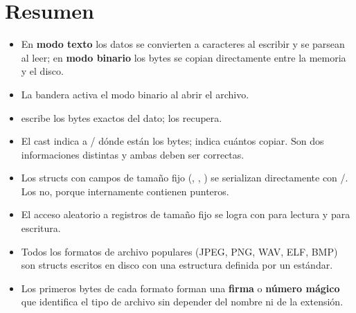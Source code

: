 \documentclass[12pt, oneside]{article}
\begin{document}
\section*{Resumen}

\begin{itemize}
  \item En \textbf{modo texto} los datos se convierten a caracteres al
        escribir y se parsean al leer; en \textbf{modo binario} los bytes
        se copian directamente entre la memoria y el disco.
  \item La bandera  activa el modo binario al abrir
        el archivo.
  \item {} escribe los bytes exactos
        del dato;  los recupera.
  \item El cast  indica a / dónde
        están los bytes;  indica cuántos copiar.  Son dos
        informaciones distintas y ambas deben ser correctas.
  \item Los structs con campos de tamaño fijo (, ,
        ) se serializan directamente con /.
        Los  no, porque internamente contienen punteros.
  \item El acceso aleatorio a registros de tamaño fijo se logra con
         para lectura y
         para escritura.
  \item Todos los formatos de archivo populares (JPEG, PNG, WAV, ELF, BMP)
        son structs escritos en disco con una estructura definida por un
        estándar.
  \item Los primeros bytes de cada formato forman una \textbf{firma} o
        \textbf{número mágico} que identifica el tipo de archivo sin
        depender del nombre ni de la extensión.
\end{itemize}
\end{document}
